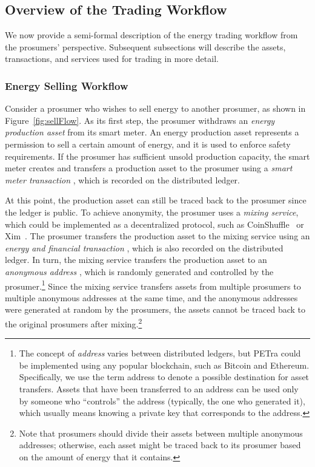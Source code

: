 \subsection{Overview of the Trading Workflow}
We now provide a semi-formal description of the energy trading workflow
from the prosumers' perspective. 
Subsequent subsections will describe the assets, transactions, and services used for trading in more detail.  

\subsubsection{Energy Selling Workflow}
Consider a prosumer who wishes to sell energy to another
prosumer, as shown in Figure~\ref{fig:sellFlow}. 
As its first step, the prosumer withdraws an \emph{energy production asset} from its smart meter.
An energy production asset represents a permission to sell a certain amount of energy, and it is used to enforce safety requirements.
If the prosumer has sufficient unsold production capacity, the smart meter creates and transfers a production asset to the prosumer using a \emph{smart meter transaction} , which is recorded on the distributed ledger.

At this point, the production asset can still be traced back to the prosumer since the ledger is public.
To achieve anonymity, the prosumer uses a \emph{mixing service}, which could be implemented as a decentralized protocol, such as CoinShuffle~\cite{ruffing2014coinshuffle} or Xim~\cite{bissias2014sybil}.
The prosumer transfers the production asset to the mixing service using an \emph{energy and financial transaction} , which is also recorded on the distributed ledger.
In turn, the mixing service
transfers the production asset to an \emph{anonymous address} ,
which is randomly generated and controlled by the
prosumer.\footnote{The concept of \emph{address} varies between distributed ledgers, but PETra could be implemented using any popular blockchain, such as Bitcoin and Ethereum. 
Specifically, we use the term address to denote a possible destination for asset transfers. 
Assets that have been transferred to an address can be used only by someone who ``controls'' the address (typically, the one who generated it), which usually means knowing a private key that corresponds to the address.} 
Since the mixing service transfers assets from multiple prosumers to
multiple anonymous addresses at the same time, and the anonymous
addresses were generated at random by the prosumers, the assets
cannot be traced back to the original prosumers after
mixing.\footnote{Note that prosumers should divide their assets between multiple
  anonymous addresses; otherwise, each asset might be traced back to
  its prosumer based on the amount of energy that it contains.}

